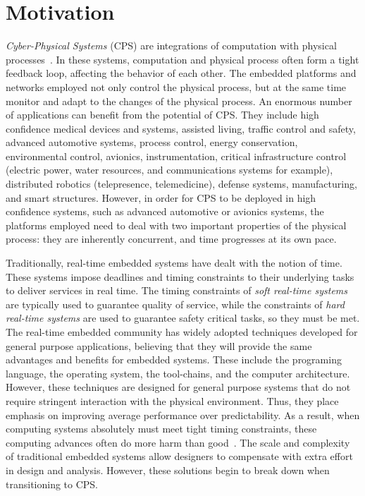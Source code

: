 \section{Motivation}
\emph{Cyber-Physical Systems} (CPS) are integrations of computation with physical processes~\cite{Lee08_CyberPhysicalSystemsDesignChallenges}.
In these systems, computation and physical process often form a tight feedback loop, affecting the behavior of each other.
The embedded platforms and networks employed not only control the physical process, but at the same time monitor and adapt to the changes of the physical process.
An enormous number of applications can benefit from the potential of CPS.
They include high confidence medical devices and systems, assisted living, traffic control and safety, advanced automotive systems, process control, energy conservation, environmental control, avionics, instrumentation, critical infrastructure control (electric power, water resources, and communications systems for example), distributed robotics (telepresence, telemedicine), defense systems, manufacturing, and smart structures.
However, in order for CPS to be deployed in high confidence systems, such as advanced automotive or avionics systems, the platforms employed need to deal with two important properties of the physical process: they are inherently concurrent, and time progresses at its own pace.
 

Traditionally, real-time embedded systems have dealt with the notion of time.
These systems impose deadlines and timing constraints to their underlying tasks to deliver services in real time. 
The timing constraints of \emph{soft real-time systems} are typically used to guarantee quality of service, while the constraints of \emph{hard real-time systems} are used to guarantee safety critical tasks, so they must be met. 
The real-time embedded community has widely adopted techniques developed for general purpose applications, believing that they will provide the same advantages and benefits for embedded systems.
These include the programing language, the operating system, the tool-chains, and the computer architecture.
However, these techniques are designed for general purpose systems that do not require stringent interaction with the physical environment. 
Thus, they place emphasis on improving average performance over predictability.   
As a result, when computing systems absolutely must meet tight timing constraints, these computing advances often do more harm than good~\cite{LeeOnTime2005}.
The scale and complexity of traditional embedded systems allow designers to compensate with extra effort in design and analysis. 
However, these solutions begin to break down when transitioning to CPS.   

